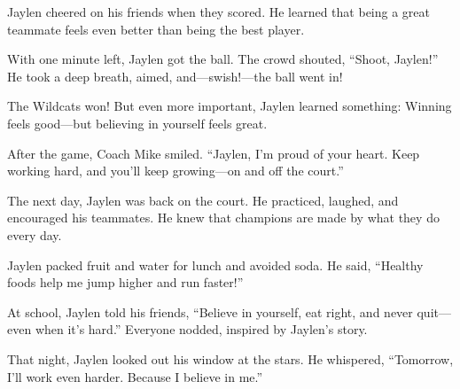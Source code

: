\documentclass[11pt, a4paper]{article}
\begin{document}
{
Jaylen cheered on his friends when they scored. He learned that being a great teammate feels even better than being the best player.
}

{
With one minute left, Jaylen got the ball. The crowd shouted, “Shoot, Jaylen!” He took a deep breath, aimed, and—swish!—the ball went in!
}

{
The Wildcats won! But even more important, Jaylen learned something: Winning feels good—but believing in yourself feels great.
}

{
After the game, Coach Mike smiled. “Jaylen, I’m proud of your heart. Keep working hard, and you’ll keep growing—on and off the court.”
}

{
The next day, Jaylen was back on the court. He practiced, laughed, and encouraged his teammates. He knew that champions are made by what they do every day.
}

{
Jaylen packed fruit and water for lunch and avoided soda. He said, “Healthy foods help me jump higher and run faster!”
}

{
At school, Jaylen told his friends, “Believe in yourself, eat right, and never quit—even when it’s hard.” Everyone nodded, inspired by Jaylen’s story.
}

{
That night, Jaylen looked out his window at the stars. He whispered, “Tomorrow, I’ll work even harder. Because I believe in me.”
}
\end{document}
